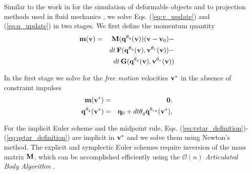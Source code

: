 Similar to the work in \cite{bib:duriez2005realistic} for the simulation of
deformable objects and to projection methods used in fluid mechanics
\cite{bib::bell1991efficient}, we solve Eqs. (\ref{eq:v_update}) and
(\ref{eq:q_update}) in two stages. We first define the momentum quantity
\begin{eqnarray}
	\mf{m}(\mf{v}) &=&
	\mf{M}(\mf{q}^{\theta_{q}}(\mf{v}))(\mf{v}-\mf{v}_0) - \nonumber\\
	&&dt\,\mf{F}(\mf{q}^{\theta_{q}}(\mf{v}), \mf{v}^{\theta_v}(\mf{v}))-\nonumber\\
	&&dt\,\mf{G}(\mf{q}^{\theta_{q}}(\mf{v}), \mf{v}^{\theta_v}(\mf{v}))
	\label{eq:m_definition}
\end{eqnarray}

In the first stage we solve for the
\textit{free motion} velocities ${\mathbf{v}}^*$ in the absence of constraint impulses
\begin{eqnarray}
	\mf{m}(\mf{v}^*) &=& \mf{0},
	\label{eq:vstar_definition}\\
	\mf{q}^{\theta_q}(\mf{v}^*) &=& \mf{q}_0 + dt\theta_q\dot{\mf{q}}^{\theta_{vq}}(\mf{v}^*),
	\label{eq:qstar_definition}
\end{eqnarray}

For the implicit Euler scheme and the midpoint rule, Eqs.
(\ref{eq:vstar_definition})-(\ref{eq:qstar_definition}) are implicit in
${\mathbf{v}}^*$ and we solve them using Newton's method. The explicit and symplectic
Euler schemes require inversion of the mass matrix ${\mathbf{M}}$, which can be
accomplished efficiently using the $\mathcal{O}(n)$
\emph{Articulated Body Algorithm}
\cite{bib:featherstone2008_rigid_body_dynamics_algorithms}.


